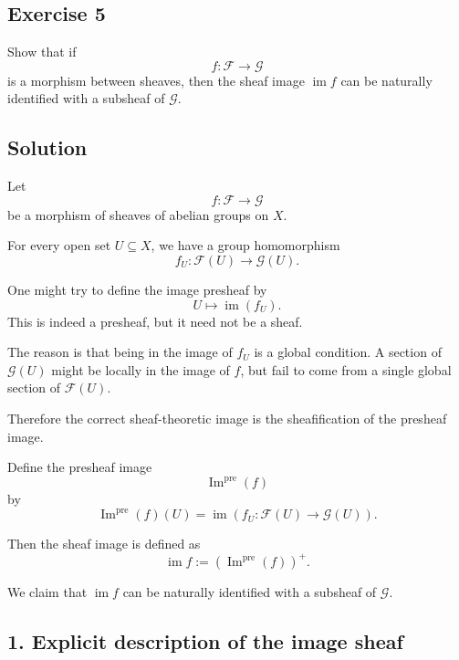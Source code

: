 
\subsection*{Exercise 5}

Show that if
\[
f : \mathcal F \longrightarrow \mathcal G
\]
is a morphism between sheaves, then the sheaf image $\operatorname{im} f$
can be naturally identified with a subsheaf of $\mathcal G$.

\subsection*{Solution}

Let
\[
f : \mathcal F \longrightarrow \mathcal G
\]
be a morphism of sheaves of abelian groups on $X$.

For every open set $U \subseteq X$, we have a group homomorphism
\[
f_U : \mathcal F(U) \longrightarrow \mathcal G(U).
\]

One might try to define the image presheaf by
\[
U \longmapsto \operatorname{im}(f_U).
\]
This is indeed a presheaf, but it need not be a sheaf.

The reason is that being in the image of $f_U$ is a global condition.
A section of $\mathcal G(U)$ might be locally in the image of $f$, but fail to
come from a single global section of $\mathcal F(U)$.

Therefore the correct sheaf-theoretic image is the sheafification of the
presheaf image.

Define the presheaf image
\[
\operatorname{Im}^{\operatorname{pre}}(f)
\]
by
\[
\operatorname{Im}^{\operatorname{pre}}(f)(U)
=
\operatorname{im}
\left(
f_U : \mathcal F(U) \to \mathcal G(U)
\right).
\]

Then the sheaf image is defined as
\[
\operatorname{im} f
:=
\left(\operatorname{Im}^{\operatorname{pre}}(f)\right)^+.
\]

We claim that $\operatorname{im} f$ can be naturally identified with a subsheaf
of $\mathcal G$.

\subsection*{1. Explicit description of the image sheaf}

